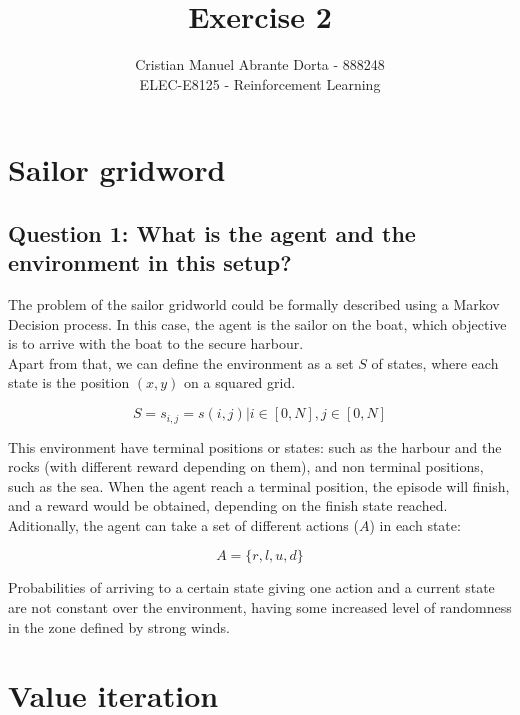 \documentclass[12pt]{article}
\begin{document}
 
\title{Exercise 2}
\author{Cristian Manuel Abrante Dorta - 888248\\
ELEC-E8125 - Reinforcement Learning}

\maketitle
\section{Sailor gridword}

\subsection{Question 1: What is the agent and the environment in this setup?}

The problem of the sailor gridworld could be formally described using a Markov Decision process. In this case, the agent is the sailor on the boat, which objective is to arrive with the boat to the secure harbour.\\

Apart from that, we can define the environment as a set $S$ of states, where each state is the position $(x,y)$ on a squared grid.

\begin{equation}
    S = {s_{i,j} = s(i,j) | i \in [0, N], j\in [0,N]}
\end{equation}

This environment have terminal positions or states: such as the harbour and the rocks (with different reward depending on them), and non terminal positions, such as the sea. When the agent reach a terminal position, the episode will finish, and a reward would be obtained, depending on the finish  state reached. \\

Aditionally, the agent can take a set of different actions ($A$) in each state:

\begin{equation}
    A = \{r, l, u, d\}
\end{equation}

Probabilities of arriving to a certain state giving one action and a current state are not constant over the environment, having some increased level of randomness in the zone defined by strong winds.

\section{Value iteration}
\end{document}

